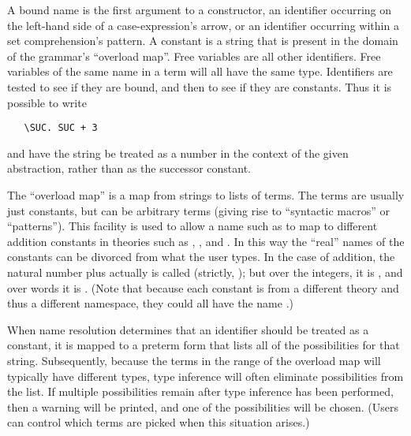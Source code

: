 \begin{description}
  A bound name is the first argument to a  constructor, an
  identifier occurring on the left-hand side of a case-expression's
  arrow, or an identifier occurring within a set comprehension's
  pattern. A constant is a string that is present in the domain of the
  grammar's ``overload map''.  Free variables are all other identifiers.
  Free variables of the same name in a term will all have the same
  type.  Identifiers are tested to see if they are bound, and then to
  see if they are constants.  Thus it is possible to write
\begin{verbatim}
   \SUC. SUC + 3
\end{verbatim}
  and have the string  be treated as a number in the
  context of the given abstraction, rather than as the successor
  constant.

  The ``overload map'' is a map from strings to lists of terms.  The
  terms are usually just constants, but can be arbitrary terms (giving
  rise to ``syntactic macros'' or ``patterns'').
  This facility is used to allow a name such as \holtxt{+} to map to
  different addition constants in theories such as
  , , and
  . In this way the ``real'' names of the constants can
  be divorced from what the user types.  In the case of addition, the
  natural number plus actually is called \holtxt{+} (strictly,
  ); but over the integers, it is
  , and over words it is .  (Note
  that because each constant is from a different theory and thus a
  different namespace, they could all have the name \holtxt{+}.)

  When name resolution determines that an identifier should be treated
  as a constant, it is mapped to a preterm form that lists all of the
  possibilities for that string.  Subsequently, because the terms in
  the range of the overload map will typically have different types,
  type inference will often eliminate possibilities from the list.  If
  multiple possibilities remain after type inference has been
  performed, then a warning will be printed, and one of the
  possibilities will be chosen.  (Users can control which terms are
  picked when this situation arises.)


\end{description}
